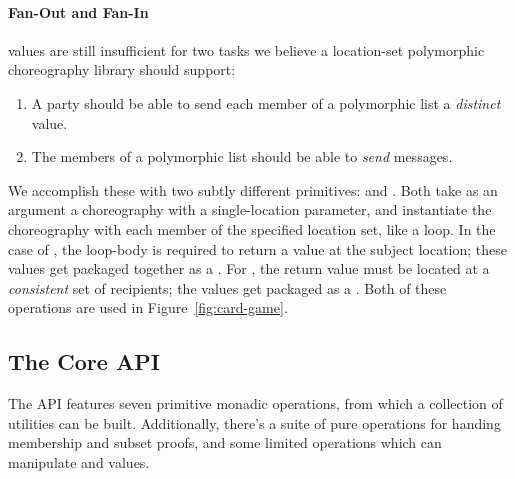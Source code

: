 \paragraph{Fan-Out and Fan-In}
 values are still insufficient for two tasks we believe a location-set polymorphic
choreography library should support:
\begin{enumerate}%
  \item A party should be able to send each member of a polymorphic list a \emph{distinct} value.
  \item The members of a polymorphic list should be able to \emph{send} messages.
\end{enumerate}
We accomplish these with two subtly different primitives:
 and .
Both take as an argument a choreography with a single-location parameter,
and instantiate the choreography with each member of the specified location set,
like a  loop.
In the case of , the loop-body is required to return a value at the subject 
location;
these values get packaged together as a .
For , the return value must be located at a \emph{consistent} set of recipients;
the values get packaged as a .
Both of these operations are used in Figure~\ref{fig:card-game}.


\subsection{The Core API}\label{sec:monad}

The \MultiChor API features seven primitive monadic operations,
from which a collection of utilities can be built.
Additionally, there's a suite of pure operations for handing membership and subset proofs,
and some limited operations which can manipulate 
and  values.


